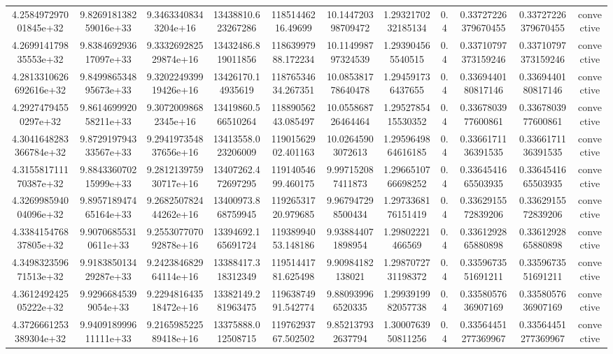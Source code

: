 \begin{table}
\begin{tabular}{ccccccccccc}
4.258497297001845e+32 & 9.826918138259016e+33 & 9.34633408343204e+16 & 13438810.623267286 & 11851446216.49699 & 10.144720398709472 & 1.2932170232185134 & 0.4 & 0.33727226379670455 & 0.33727226379670455 & convective \\
4.269914179835553e+32 & 9.838469293617097e+33 & 9.333269282529874e+16 & 13432486.819011856 & 11863997988.172234 & 10.114998797324539 & 1.293904565540515 & 0.4 & 0.33710797373159246 & 0.33710797373159246 & convective \\
4.2813310626692616e+32 & 9.849986534895673e+33 & 9.320224939919426e+16 & 13426170.14935619 & 11876534634.267351 & 10.085381778640478 & 1.294591736437655 & 0.4 & 0.3369440180817146 & 0.3369440180817146 & convective \\
4.29274794550297e+32 & 9.861469992058211e+33 & 9.30720098682345e+16 & 13419860.566510264 & 11889056243.085497 & 10.055868726464464 & 1.2952785415530352 & 0.4 & 0.3367803977600861 & 0.3367803977600861 & convective \\
4.3041648283366784e+32 & 9.872919794333567e+33 & 9.294197354837656e+16 & 13413558.023206009 & 11901562902.401163 & 10.02645903072613 & 1.2959649864616185 & 0.4 & 0.3366171136391535 & 0.3366171136391535 & convective \\
4.315581711170387e+32 & 9.884336070215999e+33 & 9.281213975930717e+16 & 13407262.472697295 & 11914054699.460175 & 9.997152087411873 & 1.2966510766698252 & 0.4 & 0.3364541665503935 & 0.3364541665503935 & convective \\
4.326998594004096e+32 & 9.895718947465164e+33 & 9.268250782444262e+16 & 13400973.868759945 & 11926531720.979685 & 9.967947298500434 & 1.2973368176151419 & 0.4 & 0.3362915572839206 & 0.3362915572839206 & convective \\
4.338415476837805e+32 & 9.90706855310611e+33 & 9.255307707092878e+16 & 13394692.165691724 & 11938994053.148186 & 9.938844071898954 & 1.29802221466569 & 0.4 & 0.3361292865880898 & 0.3361292865880898 & convective \\
4.349832359671513e+32 & 9.918385013429287e+33 & 9.242384682964114e+16 & 13388417.318312349 & 11951441781.625498 & 9.90984182138021 & 1.2987072731198372 & 0.4 & 0.3359673551691211 & 0.3359673551691211 & convective \\
4.361249242505222e+32 & 9.92966845399054e+33 & 9.229481643518472e+16 & 13382149.281963475 & 11963874991.542774 & 9.880939966520335 & 1.2993919982057738 & 0.4 & 0.3358057636907169 & 0.3358057636907169 & convective \\
4.3726661253389304e+32 & 9.940918999611111e+33 & 9.216598522589418e+16 & 13375888.012508715 & 11976293767.502502 & 9.852137932637794 & 1.3000763950811256 & 0.4 & 0.33564451277369967 & 0.33564451277369967 & convective \\

\end{tabular}
\end{table}
